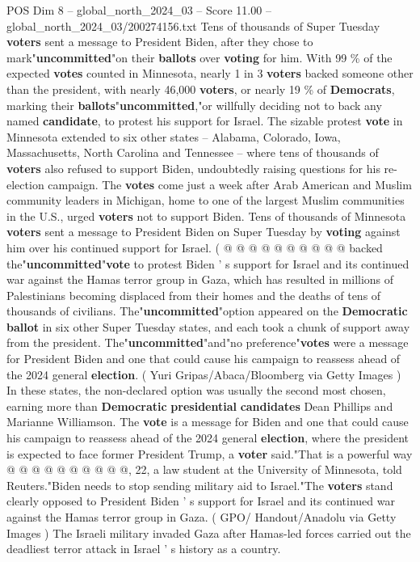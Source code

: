 \begin{textsample}{POS Dim 8 – global\_north\_2024\_03 – Score 11.00 – global\_north\_2024\_03/200274156.txt}  \label{ex:f8_pos_016}
Tens of thousands of Super Tuesday \textbf{voters} sent a message to President Biden, after they chose to mark"\textbf{uncommitted}"on their \textbf{ballots} over \textbf{voting} for him.
With 99 \% of the expected \textbf{votes} counted in Minnesota, nearly 1 in 3 \textbf{voters} backed someone other than the president, with nearly 46,000 \textbf{voters}, or nearly 19 \% of \textbf{Democrats}, marking their \textbf{ballots}"\textbf{uncommitted},"or willfully deciding not to back any named \textbf{candidate}, to protest his support for Israel.
The sizable protest \textbf{vote} in Minnesota extended to six other states -- Alabama, Colorado, Iowa, Massachusetts, North Carolina and Tennessee -- where tens of thousands of \textbf{voters} also refused to support Biden, undoubtedly raising questions for his re-election campaign.
The \textbf{votes} come just a week after Arab American and Muslim community leaders in Michigan, home to one of the largest Muslim communities in the U.S., urged \textbf{voters} not to support Biden.
Tens of thousands of Minnesota \textbf{voters} sent a message to President Biden on Super Tuesday by \textbf{voting} against him over his continued support for Israel. ( @ @ @ @ @ @ @ @ @ @ backed the"\textbf{uncommitted}"\textbf{vote} to protest Biden ' s support for Israel and its continued war against the Hamas terror group in Gaza, which has resulted in millions of Palestinians becoming displaced from their homes and the deaths of tens of thousands of civilians.
The"\textbf{uncommitted}"option appeared on the \textbf{Democratic} \textbf{ballot} in six other Super Tuesday states, and each took a chunk of support away from the president.
The"\textbf{uncommitted}"and"no preference"\textbf{votes} were a message for President Biden and one that could cause his campaign to reassess ahead of the 2024 general \textbf{election}. ( Yuri Gripas/Abaca/Bloomberg via Getty Images ) In these states, the non-declared option was usually the second most chosen, earning more than \textbf{Democratic} \textbf{presidential} \textbf{candidates} Dean Phillips and Marianne Williamson.
The \textbf{vote} is a message for Biden and one that could cause his campaign to reassess ahead of the 2024 general \textbf{election}, where the president is expected to face former President Trump, a \textbf{voter} said."That is a powerful way @ @ @ @ @ @ @ @ @ @, 22, a law student at the University of Minnesota, told Reuters."Biden needs to stop sending military aid to Israel."The \textbf{voters} stand clearly opposed to President Biden ' s support for Israel and its continued war against the Hamas terror group in Gaza. ( GPO/ Handout/Anadolu via Getty Images ) The Israeli military invaded Gaza after Hamas-led forces carried out the deadliest terror attack in Israel ' s history as a country.

\end{textsample}
